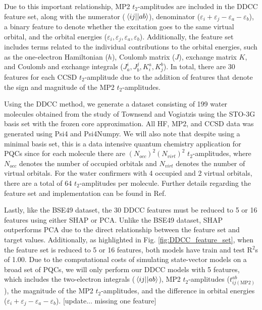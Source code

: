 \documentclass[journal=jacsat,manuscript=article]{achemso}
\begin{document}
Due to this important relationship, MP2 $t_{2}$-amplitudes are included in the DDCC feature set, along with the numerator ($\mel{ij}{}{ab}$), denominator ($\varepsilon_{i}+\varepsilon_{j}-\varepsilon_{a}-\varepsilon_{b}$), a binary feature to denote whether the excitation goes to the same virtual orbital, and the orbital energies ($\varepsilon_{i},\varepsilon_{j},\varepsilon_{a},\varepsilon_{b}$).
Additionally, the feature set includes terms related to the individual contributions to the orbital energies, such as the one-electron Hamiltonian ($h$), Coulomb matrix ($J$), exchange matrix $K$, and Coulomb and exchange integrals ($J^{i}_{a},J^{j}_{b},K^{a}_{i},K^{b}_{j}$).
In total, there are 30 features for each CCSD $t_{2}$-amplitude due to the addition of features that denote the sign and magnitude of the MP2 $t_{2}$-amplitudes.

Using the DDCC method, we generate a dataset consisting of 199 water molecules obtained from the study of Townsend and Vogiatzis using the STO-3G basis set\cite{hehre_selfconsistent_1970}  with the frozen core approximation.
All HF, MP2, and CCSD data was generated using Psi4\cite{parrish_psi4_2017} and Psi4Numpy\cite{smith_psi4numpy_2018}.
We will also note that despite using a minimal basis set, this is a data intensive quantum chemistry application for PQCs since for each molecule there are $(N_{occ})^{2}(N_{virt})^{2}$ $t_{2}$-amplitudes, where $N_{occ}$ denotes the number of occupied orbitals and $N_{virt}$ denotes the number of virtual orbitals.
For the water confirmers with 4 occupied and 2 virtual orbitals, there are a total of 64 $t_{2}$-amplitudes per molecule.
Further details regarding the feature set and implementation can be found in Ref.  \cite{townsend_data-driven_2019}

Lastly, like the BSE49 dataset, the 30 DDCC features must be reduced to 5 or 16 features using either SHAP or PCA.
Unlike the BSE49 dataset, SHAP outperforms PCA due to the direct relationship between the feature set and target values.
Additionally, as highlighted in Fig. \ref{fig:DDCC_feature_set}, when the feature set is reduced to 5 or 16 features, both models have train and test R$^{2}$s of 1.00.
Due to the computational costs of simulating state-vector models on a broad set of PQCs, we will only perform our DDCC models with 5 features, which includes the two-electron integrals ($\mel{ij}{}{ab}$), MP2 $t_{2}$-amplitudes ($t^{ab}_{ij(\text{MP2})}$), the magnitude of the MP2 $t_{2}$-amplitudes, and the difference in orbital energies ($\varepsilon_{i}+\varepsilon_{j}-\varepsilon_{a}-\varepsilon_{b}$).
[update... missing one feature]
\end{document}
